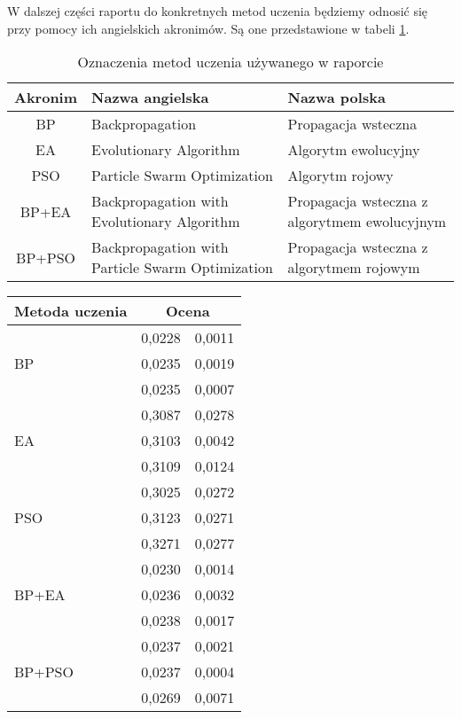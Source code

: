\documentclass[11pt,a4paper,oneside]{report}
\begin{document}
W dalszej części raportu do konkretnych metod uczenia będziemy odnosić się przy pomocy ich angielskich akronimów. Są one przedstawione w tabeli \ref{table:acronyms}.

\begin{table}[H]
	\caption{Oznaczenia metod uczenia używanego w raporcie \label{table:acronyms}}
	\begin{tabularx}{\linewidth}{|c|X|X|}
		\hline
		Akronim & Nazwa angielska & Nazwa polska \\
		\hline \hline
		BP & Backpropagation & Propagacja wsteczna \\ \hline
		EA & Evolutionary Algorithm & Algorytm ewolucyjny \\ \hline
		PSO & Particle Swarm Optimization & Algorytm rojowy \\ \hline
		BP+EA & Backpropagation with Evolutionary Algorithm & Propagacja wsteczna z algorytmem ewolucyjnym \\ \hline
		BP+PSO & Backpropagation with Particle Swarm Optimization & Propagacja wsteczna z algorytmem rojowym \\ \hline
	\end{tabularx}
\end{table}


\begin{table}[H]
	\caption{Porównanie efektywności różnych metod uczenia \label{table:compare}}
	\centering 
	\begin{longtable}{|l|r@{$\pm$}r|}
		\hline
		Metoda uczenia & \multicolumn{2}{|c|}{Ocena} \\
		\hline \hline
		\multirow{3}{*}{BP} & 0,0228 & 0,0011 \\ 
		 & 0,0235 & 0,0019 \\ 
		 & 0,0235 & 0,0007 \\ \hline
		\multirow{3}{*}{EA} & 0,3087 & 0,0278 \\ 
		 & 0,3103 & 0,0042 \\ 
		 & 0,3109 & 0,0124 \\ \hline
		\multirow{3}{*}{PSO} & 0,3025 & 0,0272 \\ 
		 & 0,3123 & 0,0271 \\ 
		 & 0,3271 & 0,0277 \\ \hline
		\multirow{3}{*}{BP+EA} & 0,0230 & 0,0014 \\
		 & 0,0236 & 0,0032 \\
		 & 0,0238 & 0,0017 \\ \hline
		\multirow{3}{*}{BP+PSO} & 0,0237 & 0,0021 \\
		 & 0,0237 & 0,0004 \\
		 & 0,0269 & 0,0071 \\ \hline
	\end{longtable}
\end{table}
\end{document}
